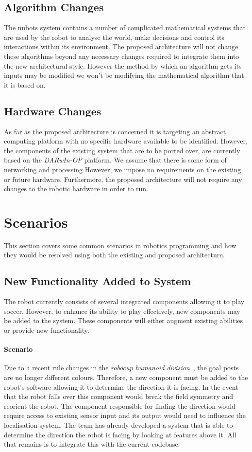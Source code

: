 \documentclass[english,12pt]{scrartcl}
\begin{document}
		\subsection{Algorithm Changes}
			The \gls{nubots} system contains a number of complicated mathematical systems that are used by the robot to analyse the world, make decisions and control its interactions within its environment. 
			The proposed architecture will not change these algorithms beyond any necessary changes required to integrate them into the new architectural style. However the method by which an algorithm gets its inputs may be modified we won't be modifying the mathematical algorithm that it is based on.
			
		\subsection{Hardware Changes}
			As far as the proposed architecture is concerned it is targeting an abstract computing platform with no specific hardware available to be identified. However, the components of the existing system that are to be ported over, are currently based on the \emph{DARwIn-OP} platform.
			We assume that there is some form of networking and processing However, we impose no requirements on the existing or future hardware.
			Furthermore, the proposed architecture will not require any changes to the robotic hardware in order to run.

	\section{Scenarios}
		This section covers some common scenarios in robotics programming and how they would be resolved 
		using both the existing and proposed architecture.

		\subsection{New Functionality Added to System}
			The robot currently consists of several integrated components allowing it to play soccer.
			However, to enhance its ability to play effectively, new components may be added to the system.
			These components will either augment existing abilities or provide new functionality.

			\paragraph{Scenario} Due to a recent rule changes in the 
			\emph{\gls{robocup} humanoid division}~\cite[Section 1.2]{humanoid2013rules}, the goal posts are no longer different colours.
			Therefore, a new component must be added to the robot's software allowing it to determine the direction it is facing.
			In the event that the robot falls over this component would break the field symmetry and reorient the robot.
			The component responsible for finding the direction would require access to existing sensor input and its output would need to influence the localisation system.
			The team has already developed a system that is able to determine the direction the robot is facing by looking at features above it.
			All that remains is to integrate this with the current codebase.
\end{document}
